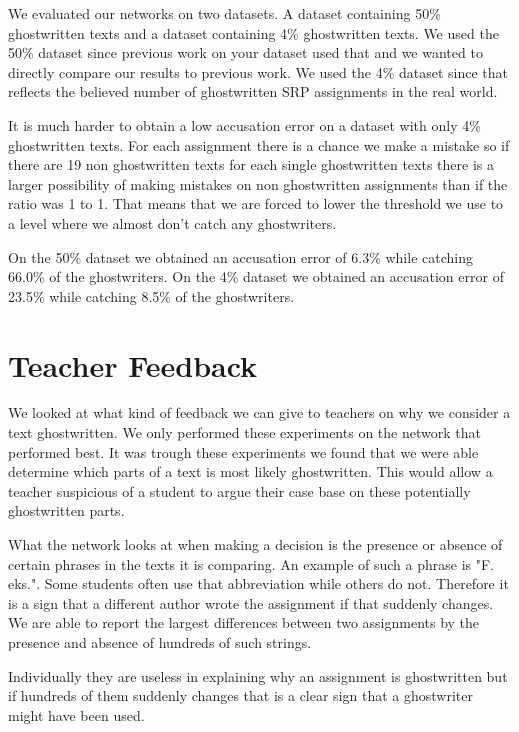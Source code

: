 \documentclass[11pt]{article}
\begin{document}
    We evaluated our networks on two datasets. A dataset containing 50\%
    ghostwritten texts and a dataset containing 4\% ghostwritten texts. We used
    the 50\% dataset since previous work on your dataset used that and we wanted
    to directly compare our results to previous work. We used the 4\% dataset
    since that reflects the believed number of ghostwritten SRP assignments in
    the real world.

    It is much harder to obtain a low accusation error on a dataset with
    only 4\% ghostwritten texts. For each assignment there is a chance we
    make a mistake so if there are 19 non ghostwritten texts for each single
    ghostwritten texts there is a larger possibility of making mistakes on non
    ghostwritten assignments than if the ratio was 1 to 1. That means that we
    are forced to lower the threshold we use to a level where we almost don't
    catch any ghostwriters.

    On the 50\% dataset we obtained an accusation error of 6.3\% while catching
    66.0\% of the ghostwriters. On the 4\% dataset we obtained an accusation
    error of 23.5\% while catching 8.5\% of the ghostwriters.


    \section{Teacher Feedback}

    We looked at what kind of feedback we can give to teachers on why we
    consider a text ghostwritten. We only performed these experiments on the
    network that performed best. It was trough these experiments we found that
    we were able determine which parts of a text is most likely ghostwritten.
    This would allow a teacher suspicious of a student to argue their case base
    on these potentially ghostwritten parts.

    What the network looks at when making a decision is the presence or absence
    of certain phrases in the texts it is comparing. An example of such a phrase
    is "F. eks.". Some students often use that abbreviation while others do not.
    Therefore it is a sign that a different author wrote the assignment if that
    suddenly changes. We are able to report the largest differences between two
    assignments by the presence and absence of hundreds of such strings.

    Individually they are useless in explaining why an assignment is
    ghostwritten but if hundreds of them suddenly changes that is a clear sign
    that a ghostwriter might have been used.
\end{document}
